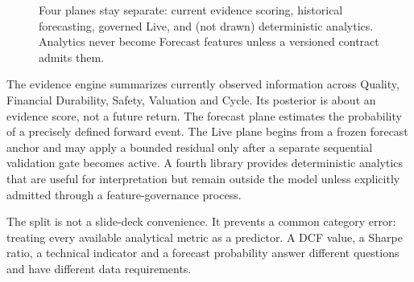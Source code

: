 \documentclass[11pt]{article}
\begin{document}
\begin{figure}[ht]
\centering
{}
\caption{Four planes stay separate: current evidence scoring, historical forecasting, governed Live, and (not drawn) deterministic analytics. Analytics never become Forecast features unless a versioned contract admits them.}
\end{figure}

The evidence engine summarizes currently observed information across Quality, Financial Durability, Safety, Valuation and Cycle. Its posterior is about an evidence score, not a future return. The forecast plane estimates the probability of a precisely defined forward event. The Live plane begins from a frozen forecast anchor and may apply a bounded residual only after a separate sequential validation gate becomes active. A fourth library provides deterministic analytics that are useful for interpretation but remain outside the model unless explicitly admitted through a feature-governance process.

The split is not a slide-deck convenience. It prevents a common category error: treating every available analytical metric as a predictor. A DCF value, a Sharpe ratio, a technical indicator and a forecast probability answer different questions and have different data requirements.
\end{document}
